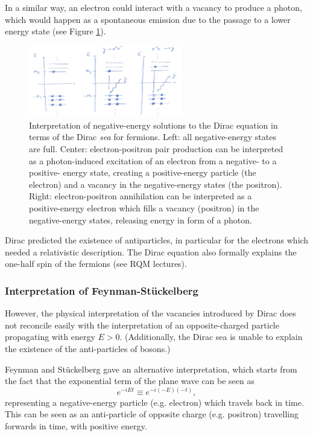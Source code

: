 In a similar way, an electron could interact with a vacancy to produce a photon, which would happen as a spontaneous emission due to the passage to a lower energy state (see Figure \ref{fig:dirac-sea}).
\begin{figure}[h]
    \centering
    \includegraphics[width=0.6\textwidth]{Figures/dirac-sea}
    \caption{Interpretation of negative-energy solutions to the Dirac equation in terms of the Dirac \textit{sea} for fermions. Left: all negative-energy states are full. Center: electron-positron pair production can be interpreted as a photon-induced excitation of an electron from a negative- to a positive- energy state, creating a positive-energy particle (the electron) and a vacancy in the negative-energy states (the positron). Right: electron-positron annihilation can be interpreted as a positive-energy electron which fills a vacancy (positron) in the negative-energy states, releasing energy in form of a photon.}
    \label{fig:dirac-sea}
\end{figure}
Dirac predicted the existence of antiparticles, in particular for the electrons which needed a relativistic description. The Dirac equation also formally explains the one-half spin of the fermions (see RQM lectures).

\subsubsection*{Interpretation of Feynman-St\"uckelberg}
However, the physical interpretation of the vacancies introduced by Dirac does not reconcile easily with the interpretation of an opposite-charged particle propagating with energy $E>0$. (Additionally, the Dirac sea is unable to explain the existence of the anti-particles of bosons.)

Feynman and St\"uckelberg gave an alternative interpretation, which starts from the fact that the exponential term of the plane wave can be seen as
\begin{equation*}
    e^{-iEt} \equiv e^{-i (-E)(-t)},
\end{equation*}
representing a negative-energy particle (e.g. electron) which travels back in time. This can be seen as an anti-particle of opposite charge (e.g. positron) travelling forwards in time, with positive energy.


